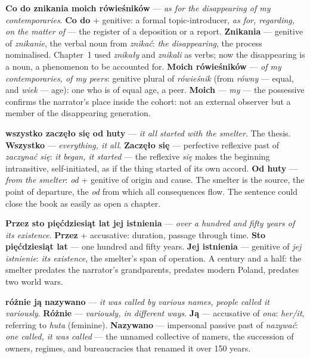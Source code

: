 \textbf{Co do znikania moich rówieśników} ---
\textit{as for the disappearing of my contemporaries}.
\textbf{Co do} + genitive: a formal topic-introducer,
\textit{as for, regarding, on the matter of} ---
the register of a deposition or a report. \textbf{Znikania}
--- genitive of \textit{znikanie}, the verbal noun from
\textit{znikać}: \textit{the disappearing}, the process
nominalised. Chapter~1 used \textit{znikały} and
\textit{znikali} as verbs; now the disappearing is a
noun, a phenomenon to be accounted for. \textbf{Moich
rówieśników} --- \textit{of my contemporaries, of my
peers}: genitive plural of \textit{rówieśnik} (from
\textit{równy} --- equal, and \textit{wiek} --- age):
one who is of equal age, a peer. \textbf{Moich} ---
\textit{my} --- the possessive confirms the narrator's
place inside the cohort: not an external observer but
a member of the disappearing generation.

\textbf{wszystko zaczęło się od huty} ---
\textit{it all started with the smelter}. The thesis.
\textbf{Wszystko} --- \textit{everything, it all}.
\textbf{Zaczęło się} --- perfective reflexive past of
\textit{zaczynać się}: \textit{it began, it started}
--- the reflexive \textit{się} makes the beginning
intransitive, self-initiated, as if the thing started
of its own accord. \textbf{Od huty} --- \textit{from
the smelter}: \textit{od} + genitive of origin and
cause. The smelter is the source, the point of
departure, the \textit{od} from which all consequences
flow. The sentence could close the book as easily as
open a chapter.

\textbf{Przez sto pięćdziesiąt lat jej istnienia} ---
\textit{over a hundred and fifty years of its existence}.
\textbf{Przez} + accusative: duration, passage through
time. \textbf{Sto pięćdziesiąt lat} --- one hundred
and fifty years. \textbf{Jej istnienia} --- genitive
of \textit{jej istnienie}: \textit{its existence},
the smelter's span of operation. A century and a half:
the smelter predates the narrator's grandparents,
predates modern Poland, predates two world wars.

\textbf{różnie ją nazywano} --- \textit{it was called
by various names, people called it variously}.
\textbf{Różnie} --- \textit{variously, in different
ways}. \textbf{Ją} --- accusative of \textit{ona}:
\textit{her/it}, referring to \textit{huta} (feminine).
\textbf{Nazywano} --- impersonal passive past of
\textit{nazywać}: \textit{one called, it was called}
--- the unnamed collective of namers, the succession
of owners, regimes, and bureaucracies that renamed
it over 150 years.

